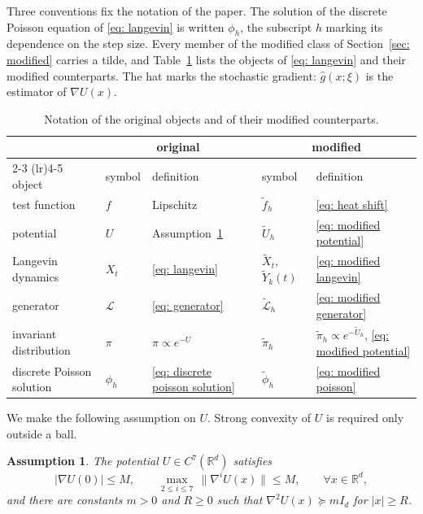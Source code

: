 \documentclass{article}
\newtheorem{assumption}{Assumption}
\newcommand{\Le}{\leqslant}
\newcommand{\Ge}{\geqslant}
\newcommand{\norm}[1]{\lVert #1 \rVert}
\numberwithin{equation}{section}
\begin{document}
Three conventions fix the notation of the paper. The solution of the discrete Poisson equation of \eqref{eq: langevin} is written $\phi_h$, the subscript $h$ marking its dependence on the step size. Every member of the modified class of Section~\ref{sec: modified} carries a tilde, and Table~\ref{tab: notation} lists the objects of \eqref{eq: langevin} and their modified counterparts. The hat marks the stochastic gradient: $\hat g(x;\xi)$ is the estimator of $\nabla U(x)$.

\begin{table}[htbp]
\centering
\begin{tabular}{lllll}
\toprule
 & \multicolumn{2}{c}{original} & \multicolumn{2}{c}{modified} \\
\cmidrule(lr){2-3} \cmidrule(lr){4-5}
object & symbol & definition & symbol & definition \\
\midrule
test function & $f$ & Lipschitz & $\tilde f_h$ & \eqref{eq: heat shift} \\
potential & $U$ & Assumption~\ref{ass: U} & $\tilde U_h$ & \eqref{eq: modified potential} \\
Langevin dynamics & $X_t$ & \eqref{eq: langevin} & $\tilde X_t$, $\tilde Y_k(t)$ & \eqref{eq: modified langevin} \\
generator & $\mathcal L$ & \eqref{eq: generator} & $\tilde{\mathcal L}_h$ & \eqref{eq: modified generator} \\
invariant distribution & $\pi$ & $\pi \propto e^{-U}$ & $\tilde\pi_h$ & $\tilde\pi_h \propto e^{-\tilde U_h}$, \eqref{eq: modified potential} \\
discrete Poisson solution & $\phi_h$ & \eqref{eq: discrete poisson solution} & $\tilde\phi_h$ & \eqref{eq: modified poisson} \\
\bottomrule
\end{tabular}
\caption{Notation of the original objects and of their modified counterparts.}
\label{tab: notation}
\end{table}

We make the following assumption on $U$. Strong convexity of $U$ is required only outside a ball.

\begin{assumption}
	\label{ass: U}
	The potential $U \in C^7(\mathbb R^d)$ satisfies
	\begin{equation*}
		|\nabla U(0)| \Le M , \qquad \max_{2 \Le i \Le 7}\, \norm{\nabla^i U(x)} \Le M , \qquad \forall x \in \mathbb R^d ,
	\end{equation*}
	and there are constants $m > 0$ and $R \Ge 0$ such that $\nabla^2 U(x) \succeq m I_d$ for $|x| \Ge R$.
\end{assumption}
\end{document}
